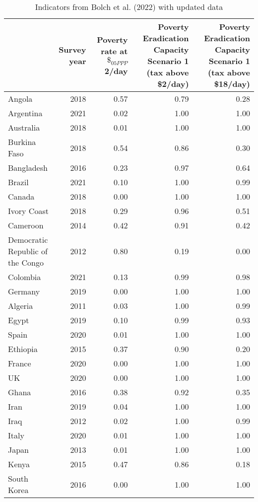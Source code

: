 
\begin{longtable}[t]{lrrrr}
\caption{\label{tab:bolch}Indicators from Bolch et al. (2022) with updated data}\\
\toprule
  & \makecell{Survey\\year} & \makecell{Poverty rate\\at $\$_{05PPP}$2}/day & \makecell{Poverty Eradication Capacity\\Scenario 1 (tax above \$2/day)} & \makecell{Poverty Eradication Capacity\\Scenario 1 (tax above \$18/day)}\\
\midrule
Angola & 2018 & 0.57 & 0.79 & 0.28\\
Argentina & 2021 & 0.02 & 1.00 & 1.00\\
Australia & 2018 & 0.01 & 1.00 & 1.00\\
Burkina Faso & 2018 & 0.54 & 0.86 & 0.30\\
Bangladesh & 2016 & 0.23 & 0.97 & 0.64\\
Brazil & 2021 & 0.10 & 1.00 & 0.99\\
Canada & 2018 & 0.00 & 1.00 & 1.00\\
Ivory Coast & 2018 & 0.29 & 0.96 & 0.51\\
Cameroon & 2014 & 0.42 & 0.91 & 0.42\\
Democratic Republic of the Congo & 2012 & 0.80 & 0.19 & 0.00\\
Colombia & 2021 & 0.13 & 0.99 & 0.98\\
Germany & 2019 & 0.00 & 1.00 & 1.00\\
Algeria & 2011 & 0.03 & 1.00 & 0.99\\
Egypt & 2019 & 0.10 & 0.99 & 0.93\\
Spain & 2020 & 0.01 & 1.00 & 1.00\\
Ethiopia & 2015 & 0.37 & 0.90 & 0.20\\
France & 2020 & 0.00 & 1.00 & 1.00\\
UK & 2020 & 0.00 & 1.00 & 1.00\\
Ghana & 2016 & 0.38 & 0.92 & 0.35\\
Iran & 2019 & 0.04 & 1.00 & 1.00\\
Iraq & 2012 & 0.02 & 1.00 & 0.99\\
Italy & 2020 & 0.01 & 1.00 & 1.00\\
Japan & 2013 & 0.01 & 1.00 & 1.00\\
Kenya & 2015 & 0.47 & 0.86 & 0.18\\
South Korea & 2016 & 0.00 & 1.00 & 1.00\\

\end{longtable}
